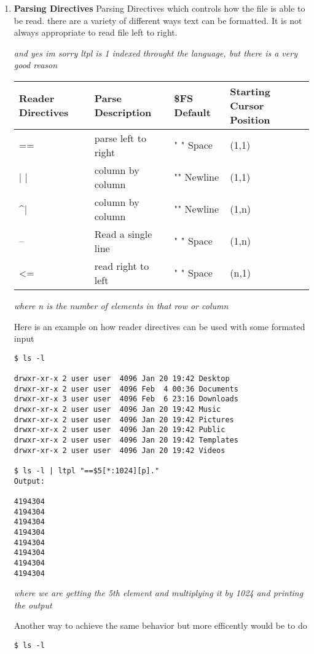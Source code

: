 \documentclass[11pt]{article}
\begin{document}
\begin{enumerate}
\item \textbf{Parsing Directives}
\label{sec:org6b08c5c}
Parsing Directives which controls how the file is able to be read.
there are a variety of different ways text can be formatted. 
It is not always appropriate to read file left to right.

\emph{and yes im sorry ltpl is 1 indexed throught the language, but there is a very good reason}
\begin{center}
\begin{tabular}{llll}
\hline
Reader Directives & Parse Description & \$FS Default & Starting Cursor Position\\
\hline
== & parse left to right & " " Space & (1,1)\\
\hline
\(\vert{}\) \(\vert{}\) & column by column & "\n" Newline & (1,1)\\
\hline
\^{}\(\vert{}\) & column by column & "\n" Newline & (1,n)\\
\hline
-- & Read a single line & " " Space & (1,n)\\
\hline
<= & read right to left & " " Space & (n,1)\\
\hline
\end{tabular}
\end{center}
\emph{where n is the number of elements in that row or column}


Here is an example on how reader directives can be used with some formated input
\begin{verbatim}
$ ls -l

drwxr-xr-x 2 user user  4096 Jan 20 19:42 Desktop 
drwxr-xr-x 2 user user  4096 Feb  4 00:36 Documents
drwxr-xr-x 3 user user  4096 Feb  6 23:16 Downloads
drwxr-xr-x 2 user user  4096 Jan 20 19:42 Music 
drwxr-xr-x 2 user user  4096 Jan 20 19:42 Pictures
drwxr-xr-x 2 user user  4096 Jan 20 19:42 Public 
drwxr-xr-x 2 user user  4096 Jan 20 19:42 Templates 
drwxr-xr-x 2 user user  4096 Jan 20 19:42 Videos

$ ls -l | ltpl "==$5[*:1024][p]."
Output: 

4194304 
4194304 
4194304 
4194304 
4194304 
4194304
4194304
4194304 
\end{verbatim}
\emph{where we are getting the 5th element and multiplying it by 1024 and printing the output}

Another way to achieve the same behavior but more efficently would be to do 
\begin{verbatim}
$ ls -l


\end{verbatim}
\end{enumerate}
\end{document}
